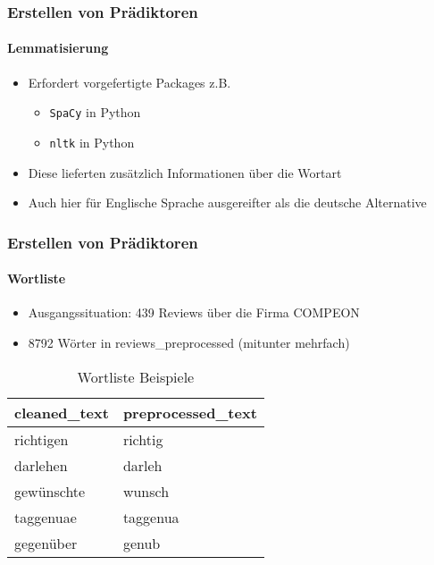 \begin{frame}
\frametitle{Erstellen von Prädiktoren}
\framesubtitle{Lemmatisierung}
\begin{itemize}\itemsep12pt
\item Erfordert vorgefertigte Packages z.B.
\begin{itemize}
\item \texttt{SpaCy} in Python
\item \texttt{nltk} in Python
\end{itemize}
\item Diese lieferten zusätzlich Informationen über die Wortart
\item Auch hier für Englische Sprache ausgereifter als die deutsche Alternative
\end{itemize}
\end{frame}

\begin{frame}
\frametitle{Erstellen von Prädiktoren}
\framesubtitle{Wortliste}
\begin{itemize}
\item Ausgangssituation: 439 Reviews über die Firma COMPEON 
\item 8792 Wörter in reviews\_preprocessed (mitunter mehrfach)
\end{itemize}
\begin{table}
	\centering
		\begin{tabular}[h]{l|l}
			cleaned\_text & preprocessed\_text \\
			\hline
			richtigen & richtig \\
			\hline
			darlehen & darleh \\
			\hline
			gewünschte & wunsch \\
			\hline
			taggenuae & taggenua \\
			\hline
			gegenüber & genub
\end{tabular}
		\item
	\caption{Wortliste Beispiele}
	\label{tab:WortlisteBeispiele}
\end{table}
\end{frame}

%
